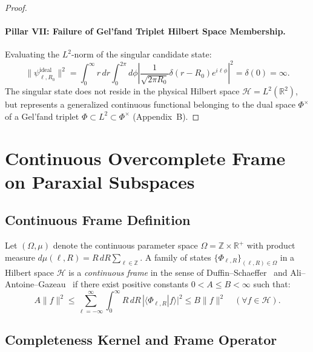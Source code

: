 \documentclass{optica-article}
\begin{document}
\begin{proof}
\paragraph{Pillar VII: Failure of Gel'fand Triplet Hilbert Space Membership.}
Evaluating the $L^2$-norm of the singular candidate state:
\begin{equation}
\|\psi_{\ell, R_0}^{\text{ideal}}\|^2 = \int_0^\infty r \, dr \int_0^{2\pi} d\phi \left| \frac{1}{\sqrt{2\pi R_0}} \delta(r - R_0) e^{i \ell \phi} \right|^2 = \delta(0) = \infty.
\end{equation}
The singular state does not reside in the physical Hilbert space $\mathcal{H} = L^2(\mathbb{R}^2)$, but represents a generalized continuous functional belonging to the dual space $\Phi^\times$ of a Gel'fand triplet $\Phi \subset L^2 \subset \Phi^\times$ (Appendix~B).
\end{proof}

\section{Continuous Overcomplete Frame on Paraxial Subspaces}
\label{sec:frame_theory}

\subsection{Continuous Frame Definition}

Let $(\Omega, \mu)$ denote the continuous parameter space $\Omega = \mathbb{Z} \times \mathbb{R}^+$ with product measure $d\mu(\ell, R) = R \, dR \sum_{\ell \in \mathbb{Z}}$. A family of states $\{\Phi_{\ell, R}\}_{(\ell, R) \in \Omega}$ in a Hilbert space $\mathcal{H}$ is a \emph{continuous frame} in the sense of Duffin--Schaeffer~\cite{Duffin1952} and Ali--Antoine--Gazeau~\cite{Ali1993} if there exist positive constants $0 < A \le B < \infty$ such that:
\begin{equation}
A \|f\|^2 \le \sum_{\ell=-\infty}^\infty \int_0^\infty R \, dR \, |\langle \Phi_{\ell, R} | f \rangle|^2 \le B \|f\|^2 \quad (\forall f \in \mathcal{H}).
\label{eq:frame_def}
\end{equation}

\subsection{Completeness Kernel and Frame Operator}
\end{document}

